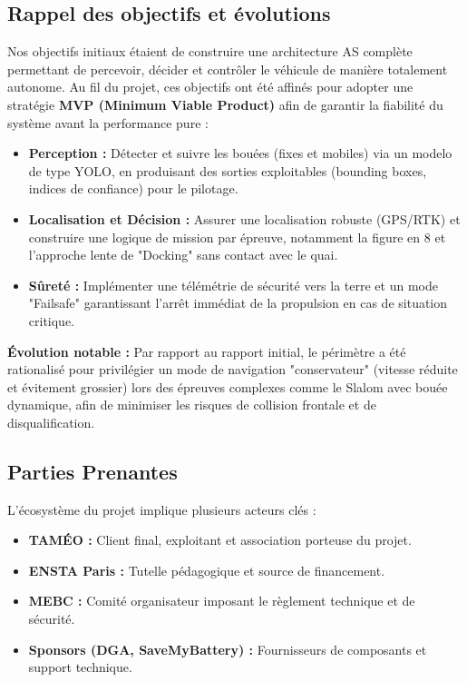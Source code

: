 \documentclass[11pt, a4paper]{article}
\begin{document}
\subsection{Rappel des objectifs et évolutions}
Nos objectifs initiaux étaient de construire une architecture AS complète permettant de percevoir, décider et contrôler le véhicule de manière totalement autonome. Au fil du projet, ces objectifs ont été affinés pour adopter une stratégie \textbf{MVP (Minimum Viable Product)} afin de garantir la fiabilité du système avant la performance pure :
\begin{itemize}
    \item \textbf{Perception :} Détecter et suivre les bouées (fixes et mobiles) via un modelo de type YOLO, en produisant des sorties exploitables (bounding boxes, indices de confiance) pour le pilotage.
    \item \textbf{Localisation et Décision :} Assurer une localisation robuste (GPS/RTK) et construire une logique de mission par épreuve, notamment la figure en 8 et l'approche lente de "Docking" sans contact avec le quai.
    \item \textbf{Sûreté :} Implémenter une télémétrie de sécurité vers la terre et un mode "Failsafe" garantissant l'arrêt immédiat de la propulsion en cas de situation critique.
\end{itemize}

\textbf{Évolution notable :} Par rapport au rapport initial, le périmètre a été rationalisé pour privilégier un mode de navigation "conservateur" (vitesse réduite et évitement grossier) lors des épreuves complexes comme le Slalom avec bouée dynamique, afin de minimiser les risques de collision frontale et de disqualification.

\subsection{Parties Prenantes}
L'écosystème du projet implique plusieurs acteurs clés :
\begin{itemize}
    \item \textbf{TAMÉO :} Client final, exploitant et association porteuse du projet.
    \item \textbf{ENSTA Paris :} Tutelle pédagogique et source de financement.
    \item \textbf{MEBC :} Comité organisateur imposant le règlement technique et de sécurité.
    \item \textbf{Sponsors (DGA, SaveMyBattery) :} Fournisseurs de composants et support technique.
\end{itemize}
\end{document}
